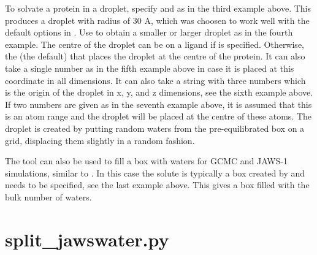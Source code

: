 \documentclass[letterpaper,10pt,english]{sphinxmanual}
\begin{document}
To solvate a protein in a droplet, specify  and  as in the third example above. This produces a droplet with radius of 30 A, which was choosen to work well with the default options in . Use  to obtain a smaller or larger droplet as in the fourth example. The centre of the droplet can be on a ligand if  is specified. Otherwise, the  (the default) that places the droplet at the centre of the protein. It can also take a single number as in the fifth example above in case it is placed at this coordinate in all dimensions. It can also take a string with three numbers which is the origin of the droplet in x, y, and z dimensions, see the sixth example above. If two numbers are given as in the seventh example above, it is assumed that this is an atom range and the droplet will be placed at the centre of these atoms. The droplet is created by putting random waters from the pre-equilibrated box on a grid, displacing them slightly in a random fashion.

The tool can also be used to fill a box with waters for GCMC and JAWS-1 simulations, similar to . In this case the solute is typically a box created by  and  needs to be specified, see the last example above. This gives a box filled with the bulk number of waters.


\section{split\_jawswater.py}
\label{\detokenize{tools:split-jawswater-py}}

%
\begin{sphinxVerbatim}[commandchars=\\\{\}]
  
    
\end{sphinxVerbatim}

\end{document}
